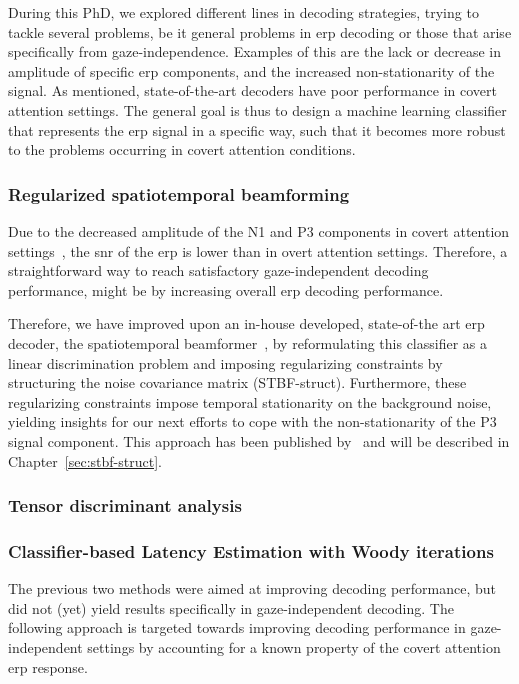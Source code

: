 During this PhD, we explored different lines in decoding strategies,
trying to tackle several problems, be it general problems in \ac{erp} decoding
or those that arise specifically from gaze-independence.
Examples of this are the lack or decrease in amplitude of specific \ac{erp} components, and the increased
non-stationarity of the signal.
As mentioned, state-of-the-art decoders have poor performance in covert attention
settings.
The general goal is thus to design a machine learning classifier that represents
the \ac{erp} signal in a specific way, such that it becomes more robust to the problems
occurring in covert attention conditions.

\subsubsection{Regularized spatiotemporal beamforming}
Due to the decreased amplitude of the N1 and P3 components in covert attention
settings~\cite{Treder2010}, the \ac{snr} of
the \ac{erp} is lower than in overt attention settings.
Therefore, a straightforward way to reach satisfactory
gaze-independent decoding performance, might be by increasing overall \ac{erp}
decoding performance.

Therefore, we have improved upon an in-house developed, state-of-the art \ac{erp}
decoder, the spatiotemporal beamformer~\cite{Wittevrongel2016}, by reformulating
this classifier as a linear discrimination problem and
imposing regularizing constraints by structuring the noise covariance matrix
(STBF-struct).
Furthermore, these regularizing constraints impose temporal stationarity on
the background noise, yielding insights for our next
efforts to cope with the non-stationarity of the P3 signal component.
This approach has been published by~\textcite{VanDenKerchove2022} and will be
described in Chapter~\ref{sec:stbf-struct}.

\subsubsection{Tensor discriminant analysis}

\subsubsection{Classifier-based Latency Estimation with Woody iterations}
The previous two methods were aimed at improving decoding performance, but
did not (yet) yield results specifically in gaze-independent decoding.
The following approach is targeted towards improving decoding performance in
gaze-independent settings by accounting for a known property of the covert
attention \ac{erp} response.


